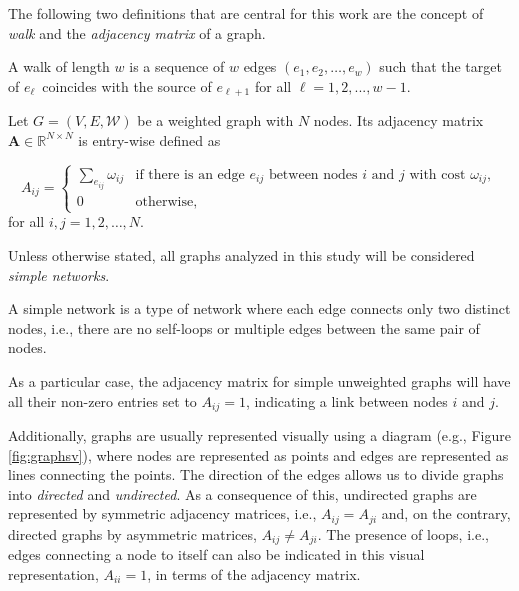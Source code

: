 The following two definitions that are central for this work are the concept of \textit{walk} and the \textit{adjacency matrix} of a graph.  

\begin{definition}
    A walk of length $w$ is a sequence of $w$ edges $(e_1, e_2, \dots, e_w)$ such that the target of $e_\ell$ coincides with the source of $e_{\ell+1}$ for all $\ell=1, 2, ..., w−1$.
\end{definition}
  
\begin{definition}
	Let $G =(V, E, \mathcal{W})$ be a weighted graph with $N$ nodes. Its adjacency matrix $\mathbf{A}\in\mathbb{R}^{N\times N}$ is entry-wise defined as
 
 \begin{equation}
  A_{ij} =
    \begin{cases}
      \sum_{e_{ij}}\omega_{ij} & \text{if there is an edge $e_{ij}$ between nodes $i$ and $j$ with cost $\omega_{ij}$},\\
      0 & \text{otherwise},
    \end{cases}       
\end{equation}
for all $i, j = 1,2,\dots, N$.
\end{definition}

Unless otherwise stated, all graphs analyzed in this study will be considered \textit{simple networks}.

\begin{definition}
    A simple network is a type of network where each edge connects only two distinct nodes, i.e., there are no self-loops or multiple edges between the same pair of nodes. 
\end{definition}
As a particular case, the adjacency matrix for simple unweighted graphs will have all their non-zero entries set to $A_{ij}=1$, indicating a link between nodes $i$ and $j$.

Additionally, graphs are usually represented visually using a diagram (e.g., Figure \ref{fig:graphsv}), where nodes are represented as points and edges are represented as lines connecting the points. The direction of the edges allows us to divide graphs into \textit{directed} and \textit{undirected}. As a consequence of this, undirected graphs are represented by symmetric adjacency matrices, i.e., $A_{ij}=A_{ji}$ and, on the contrary, directed graphs by asymmetric matrices, $A_{ij}\ne A_{ji}$. The presence of loops, i.e., edges connecting a node to itself can also be indicated in this visual representation, $A_{ii} = 1$, in terms of the adjacency matrix.


